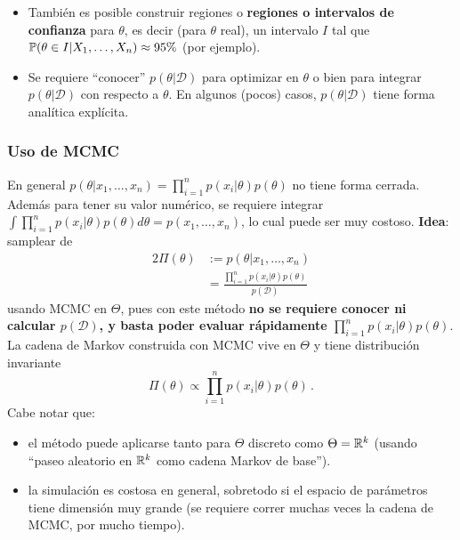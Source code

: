 \begin{remark}
\beforeitemize
\begin{itemize}
    \item También es posible construir regiones o \textbf{regiones o intervalos de confianza} para $\theta$, es decir (para $\theta$ real), un intervalo $I$ tal que $\P(\theta\in I | X_1,\dots,X_n)\approx 95\%$ (por ejemplo).
    \item Se requiere ``conocer'' $p(\theta|\mathcal{D})$ para optimizar en $\theta$ o bien para integrar $p(\theta|\mathcal{D})$ con respecto a $\theta$. En algunos (pocos) casos, $p(\theta|\mathcal{D})$ tiene forma analítica explícita.
\end{itemize}
\end{remark}
\subsubsection{Uso de MCMC}
En general $p(\theta|x_1,\dots,x_n)=\displaystyle \prod^n_{i=1}p(x_i|\theta)p(\theta)$ no tiene forma cerrada.
\newline Además para tener su valor numérico, se requiere integrar $\int\prod^n_{i=1}p(x_i|\theta)p(\theta)d\theta=p(x_1,\dots,x_n)$, lo cual puede ser muy costoso.
\newp \textbf{Idea}: samplear de
\begin{alignat*}{2}
    \Pi(\theta) & := p(\theta|x_1,\dots,x_n)\\
     & = \displaystyle \frac{\prod^n_{i=1}p(x_i|\theta)p(\theta)}{p(\mathcal{D})}\,
\end{alignat*}
usando MCMC en $\Theta$, pues con este m\'etodo \textbf{no se requiere conocer ni calcular $p(\mathcal{D})$, y 
basta poder evaluar rápidamente $\prod^n_{i=1}p(x_i|\theta)p(\theta)$}. La cadena de Markov construida con MCMC vive en $\Theta$ y tiene distribución invariante $$\Pi(\theta)\propto\displaystyle\prod^n_{i=1}p(x_i|\theta)p(\theta)\,.$$  
Cabe notar que: 
\begin{itemize}
    \item el m\'etodo puede aplicarse tanto para $\Theta$ discreto como $\Theta=\R^k$ (usando ``paseo aleatorio en $\R^k$ como cadena Markov de base''). %
    \item la simulación es costosa en general, sobretodo si el espacio de parámetros tiene dimensión muy grande (se requiere correr muchas veces la cadena de MCMC, por mucho tiempo).
\end{itemize}
